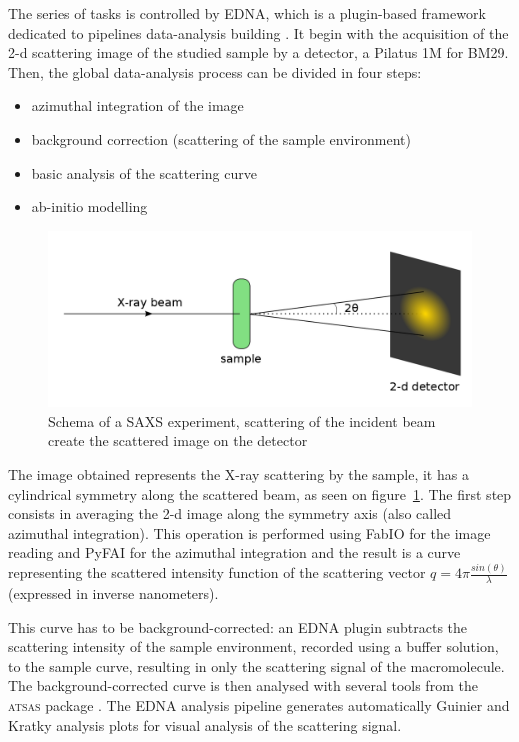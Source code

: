 \documentclass[a4paper, 11pt]{report}
\begin{document}
The series of tasks is controlled by EDNA, which is a plugin-based 
framework dedicated to pipelines data-analysis building \cite{edna}. 
It begin with the acquisition of the 2-d scattering image of the 
studied sample by a detector, a Pilatus 1M for BM29. 
Then, the global data-analysis process can be divided in four steps: 
\begin{itemize}
 \item azimuthal integration of the image
 \item background correction (scattering of the sample environment)
 \item basic analysis of the scattering curve
 \item ab-initio modelling
\end{itemize}

\begin{figure}
\centering
\includegraphics[scale=0.3]{schemaSAXS.png}
\caption{Schema of a SAXS experiment, scattering of the incident beam 
    create the scattered image on the detector}
\label{fgr:schemaSAXS}
\end{figure}

The image obtained represents the X-ray scattering by the sample, it 
has a cylindrical symmetry along the scattered beam, as seen on 
figure~\ref{fgr:schemaSAXS}. 
The first step consists in averaging the 2-d image along the 
symmetry axis (also called azimuthal integration).  
This operation is performed using FabIO \cite{fabio} for the image 
reading and PyFAI \cite{pyFAI} for the azimuthal integration and the 
result is a curve representing the scattered intensity function of the 
scattering vector $q = 4 \pi \frac{sin(\theta)}{\lambda}$ (expressed 
in inverse nanometers).

This curve has to be background-corrected: an EDNA plugin subtracts the
scattering intensity of the sample environment, recorded using a buffer
solution, to the sample curve, resulting in only the scattering signal of the
macromolecule. The background-corrected curve is then analysed with several
tools from the \textsc{atsas} package \cite{atsas}. 
The EDNA analysis pipeline generates automatically Guinier and Kratky
analysis plots for visual analysis of the scattering signal.\\
\end{document}
